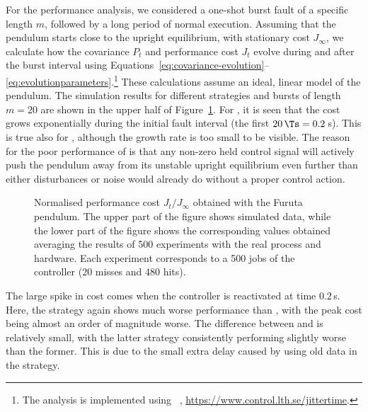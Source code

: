 For the performance analysis, we considered a one-shot burst fault of a specific length $m$, followed by a long period of normal execution. 
Assuming that the pendulum starts close to the upright equilibrium, with stationary cost $J_\infty$, we calculate how the covariance $P_t$ and performance cost $J_t$ evolve during and after the burst interval using Equations~\eqref{eq:covariance-evolution}--\eqref{eq:evolutionparameters}.\footnote{The analysis is implemented using ~\cite{Cervin:2019}, \url{https://www.control.lth.se/jittertime}.} 
These calculations assume an ideal, linear model of the pendulum. 
The simulation results for different strategies and bursts of length $m=20$ are shown in the upper half of Figure~\ref{fig:cost_simvsreal}. 
For \tH{}, it is seen that the cost grows exponentially during the initial fault interval (the first $20\,\Ts=0.2\,$s). 
This is true also for \tZ{}, although the growth rate is too small to be visible.
The reason for the poor performance of \tH{} is that any non-zero held control signal will actively push the pendulum away from its unstable upright equilibrium even further than either disturbances or noise would already do without a proper control action.
%
\begin{figure}
    \centering
    
    \caption{Normalised performance cost $J_t/J_\infty$ obtained with the Furuta pendulum.
        The upper part of the figure shows simulated data, while the lower part of the figure shows the corresponding values obtained averaging the results of 500 experiments with the real process and hardware.
        Each experiment corresponds to a 500 jobs of the controller (20 misses and 480 hits).}
    \label{fig:cost_simvsreal}
\end{figure}


The large spike in cost comes when the controller is reactivated at time $0.2\,$s. 
Here, the \tH{} strategy again shows much worse performance than \tZ{}, with the peak cost being almost an order of magnitude worse. 
The difference between \tK{} and \tS{} is relatively small, with the latter strategy consistently performing slightly worse than the former. 
This is due to the small extra delay caused by using old data in the \tS{} strategy.

